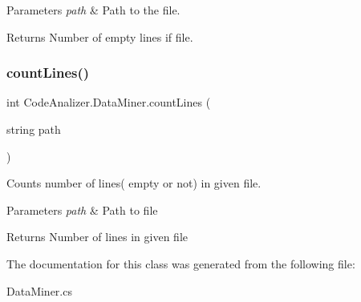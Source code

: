 \begin{DoxyParams}{Parameters}
{\em path} & Path to the file.\\
\hline
\end{DoxyParams}
\begin{DoxyReturn}{Returns}
Number of empty lines if file.
\end{DoxyReturn}
\mbox{\label{class_code_analizer_1_1_data_miner_a40b1994ce7b6fdc90cf40c443d7fb503}} 
\subsubsection{\texorpdfstring{count\+Lines()}{countLines()}}
{\footnotesize\ttfamily int Code\+Analizer.\+Data\+Miner.\+count\+Lines (\begin{DoxyParamCaption}\item[{string}]{path }\end{DoxyParamCaption})}



Counts number of lines( empty or not) in given file. 


\begin{DoxyParams}{Parameters}
{\em path} & Path to file\\
\hline
\end{DoxyParams}
\begin{DoxyReturn}{Returns}
Number of lines in given file
\end{DoxyReturn}


The documentation for this class was generated from the following file\+:\begin{DoxyCompactItemize}
\item 
Data\+Miner.\+cs\end{DoxyCompactItemize}
